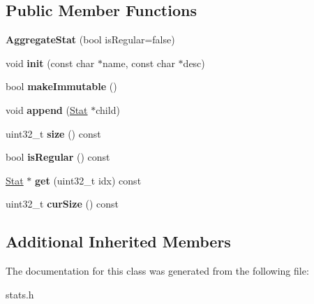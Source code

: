 \subsection*{Public Member Functions}
\begin{DoxyCompactItemize}
\item 
\hypertarget{classAggregateStat_a4f69488195511be076a792bd6b4bb4d3}{{\bfseries Aggregate\-Stat} (bool is\-Regular=false)}\label{classAggregateStat_a4f69488195511be076a792bd6b4bb4d3}

\item 
\hypertarget{classAggregateStat_a5a872e7b0af5362eaae6b304fef84238}{void {\bfseries init} (const char $\ast$name, const char $\ast$desc)}\label{classAggregateStat_a5a872e7b0af5362eaae6b304fef84238}

\item 
\hypertarget{classAggregateStat_ab2265e46065d4664f3f4507a8c3691b1}{bool {\bfseries make\-Immutable} ()}\label{classAggregateStat_ab2265e46065d4664f3f4507a8c3691b1}

\item 
\hypertarget{classAggregateStat_af4f3bbb6a336b481299b936ddcced4cb}{void {\bfseries append} (\hyperlink{classStat}{Stat} $\ast$child)}\label{classAggregateStat_af4f3bbb6a336b481299b936ddcced4cb}

\item 
\hypertarget{classAggregateStat_a20e9df9e5246b41edd111b5088118d8a}{uint32\-\_\-t {\bfseries size} () const }\label{classAggregateStat_a20e9df9e5246b41edd111b5088118d8a}

\item 
\hypertarget{classAggregateStat_a0ecf5b1c93991c7d5c5cc4fa2c07287c}{bool {\bfseries is\-Regular} () const }\label{classAggregateStat_a0ecf5b1c93991c7d5c5cc4fa2c07287c}

\item 
\hypertarget{classAggregateStat_a52c0cebe85e6e2f147329a3f3ad771a7}{\hyperlink{classStat}{Stat} $\ast$ {\bfseries get} (uint32\-\_\-t idx) const }\label{classAggregateStat_a52c0cebe85e6e2f147329a3f3ad771a7}

\item 
\hypertarget{classAggregateStat_a79cb6a42f80d59c331cba872eff8d6ff}{uint32\-\_\-t {\bfseries cur\-Size} () const }\label{classAggregateStat_a79cb6a42f80d59c331cba872eff8d6ff}

\end{DoxyCompactItemize}
\subsection*{Additional Inherited Members}


The documentation for this class was generated from the following file\-:\begin{DoxyCompactItemize}
\item 
stats.\-h\end{DoxyCompactItemize}

